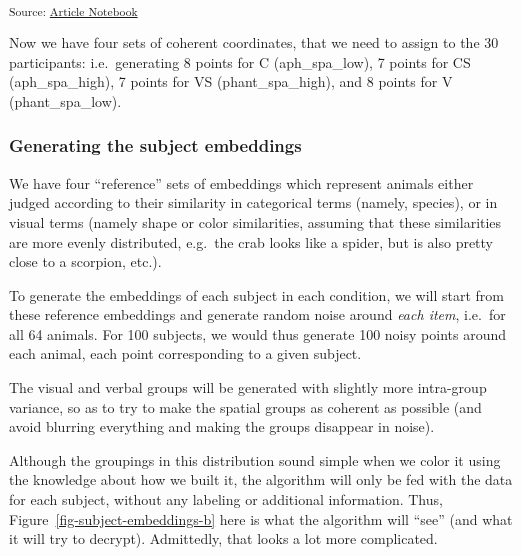 \documentclass[
  authoryear]{elsarticle}
\begin{document}
\textsubscript{Source:
\href{https://m-delem.github.io/2499-similarity-manuscript/index.qmd.html}{Article
Notebook}}

Now we have four sets of coherent coordinates, that we need to assign to
the 30 participants: i.e.~generating 8 points for C (aph\_spa\_low), 7
points for CS (aph\_spa\_high), 7 points for VS (phant\_spa\_high), and
8 points for V (phant\_spa\_low).

\subsubsection{Generating the subject
embeddings}\label{generating-the-subject-embeddings}

We have four ``reference'' sets of embeddings which represent animals
either judged according to their similarity in categorical terms
(namely, species), or in visual terms (namely shape or color
similarities, assuming that these similarities are more evenly
distributed, e.g.~the crab looks like a spider, but is also pretty close
to a scorpion, etc.).

To generate the embeddings of each subject in each condition, we will
start from these reference embeddings and generate random noise around
\emph{each item}, i.e.~for all 64 animals. For 100 subjects, we would
thus generate 100 noisy points around each animal, each point
corresponding to a given subject.

The visual and verbal groups will be generated with slightly more
intra-group variance, so as to try to make the spatial groups as
coherent as possible (and avoid blurring everything and making the
groups disappear in noise).

Although the groupings in this distribution sound simple when we color
it using the knowledge about how we built it, the algorithm will only be
fed with the data for each subject, without any labeling or additional
information. Thus, Figure~\ref{fig-subject-embeddings-b} here is what
the algorithm will ``see'' (and what it will try to decrypt).
Admittedly, that looks a lot more complicated.
\end{document}
